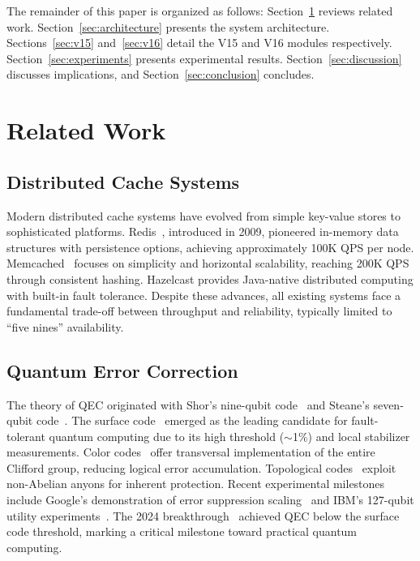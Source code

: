 \documentclass[12pt,a4paper]{article}
\theoremstyle{definition}
\begin{document}
The remainder of this paper is organized as follows: Section~\ref{sec:related} reviews related work. Section~\ref{sec:architecture} presents the system architecture. Sections~\ref{sec:v15} and~\ref{sec:v16} detail the V15 and V16 modules respectively. Section~\ref{sec:experiments} presents experimental results. Section~\ref{sec:discussion} discusses implications, and Section~\ref{sec:conclusion} concludes.

\section{Related Work}\label{sec:related}

\subsection{Distributed Cache Systems}
Modern distributed cache systems have evolved from simple key-value stores to sophisticated platforms. Redis~\cite{ref15}, introduced in 2009, pioneered in-memory data structures with persistence options, achieving approximately 100K QPS per node. Memcached~\cite{ref14} focuses on simplicity and horizontal scalability, reaching 200K QPS through consistent hashing. Hazelcast provides Java-native distributed computing with built-in fault tolerance. Despite these advances, all existing systems face a fundamental trade-off between throughput and reliability, typically limited to ``five nines'' availability.

\subsection{Quantum Error Correction}
The theory of QEC originated with Shor's nine-qubit code~\cite{ref2} and Steane's seven-qubit code~\cite{ref4}. The surface code~\cite{ref6} emerged as the leading candidate for fault-tolerant quantum computing due to its high threshold ($\sim$1\%) and local stabilizer measurements. Color codes~\cite{ref7} offer transversal implementation of the entire Clifford group, reducing logical error accumulation. Topological codes~\cite{ref5,ref8} exploit non-Abelian anyons for inherent protection. Recent experimental milestones include Google's demonstration of error suppression scaling~\cite{ref9} and IBM's 127-qubit utility experiments~\cite{ref10}. The 2024 breakthrough~\cite{ref12} achieved QEC below the surface code threshold, marking a critical milestone toward practical quantum computing.
\end{document}
